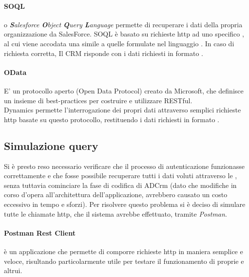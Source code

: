 \documentclass[12pt,a4paper,twoside,openany,english]{book}
\begin{document}
			\paragraph{SOQL}
			o \textit{\textbf{S}alesforce \textbf{O}bject \textbf{Q}uery \textbf{L}anguage} permette di recuperare i dati della propria organizzazione da SalesForce. SOQL è basato su richieste \gls{http} ad uno specifico , al cui  viene accodata una  simile a quelle formulate nel linguaggio . In caso di richiesta corretta, Il \gls{CRM} risponde con i dati richiesti in formato .
			\paragraph{OData}
			E' un protocollo aperto (Open Data Protocol) creato da Microsoft, che definisce un insieme di best-practices per costruire e utilizzare  RESTful.\\
			Dynamics permette l'interrogazione dei propri dati attraverso semplici richieste \gls{http} basate su questo protocollo, restituendo i dati richiesti in formato .
			
		\subsection{Simulazione query}
			Si è presto reso necessario verificare che il processo di autenticazione funzionasse correttamente e che fosse possibile recuperare tutti i dati voluti attraverso le , senza tuttavia cominciare la fase di codifica di ADCrm (dato che modifiche in corso d'opera all'architettura dell'applicazione, avrebbero causato un costo eccessivo in tempo e sforzi).
			Per risolvere questo problema si è deciso di simulare tutte le chiamate \gls{http}, che il sistema avrebbe effettuato, tramite \textit{Postman}.
			\paragraph{Postman Rest Client} è un applicazione che permette di comporre richieste \gls{http} in maniera semplice e veloce, risultando particolarmente utile per testare il funzionamento di  proprie e altrui.
			\par
						
\end{document}
